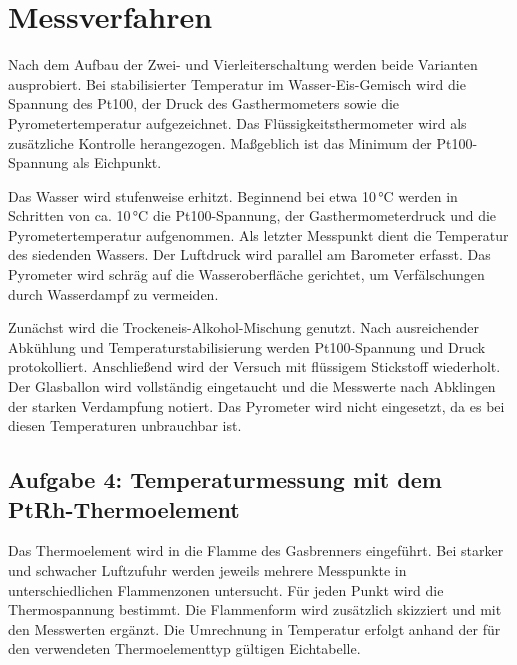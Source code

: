 \section{Messverfahren}


Nach dem Aufbau der Zwei- und Vierleiterschaltung werden beide Varianten ausprobiert. Bei stabilisierter Temperatur im Wasser-Eis-Gemisch wird die Spannung des Pt100, der Druck des Gasthermometers sowie die Pyrometertemperatur aufgezeichnet. Das Flüssigkeitsthermometer wird als zusätzliche Kontrolle herangezogen. Maßgeblich ist das Minimum der Pt100-Spannung als Eichpunkt.


Das Wasser wird stufenweise erhitzt. Beginnend bei etwa 10\,°C werden in Schritten von ca. 10\,°C die Pt100-Spannung, der Gasthermometerdruck und die Pyrometertemperatur aufgenommen. Als letzter Messpunkt dient die Temperatur des siedenden Wassers. Der Luftdruck wird parallel am Barometer erfasst. Das Pyrometer wird schräg auf die Wasseroberfläche gerichtet, um Verfälschungen durch Wasserdampf zu vermeiden.


Zunächst wird die Trockeneis-Alkohol-Mischung genutzt. Nach ausreichender Abkühlung und Temperaturstabilisierung werden Pt100-Spannung und Druck protokolliert. Anschließend wird der Versuch mit flüssigem Stickstoff wiederholt. Der Glasballon wird vollständig eingetaucht und die Messwerte nach Abklingen der starken Verdampfung notiert. Das Pyrometer wird nicht eingesetzt, da es bei diesen Temperaturen unbrauchbar ist.

\subsection*{Aufgabe 4: Temperaturmessung mit dem PtRh-Thermoelement}
Das Thermoelement wird in die Flamme des Gasbrenners eingeführt. Bei starker und schwacher Luftzufuhr werden jeweils mehrere Messpunkte in unterschiedlichen Flammenzonen untersucht. Für jeden Punkt wird die Thermospannung bestimmt. Die Flammenform wird zusätzlich skizziert und mit den Messwerten ergänzt. Die Umrechnung in Temperatur erfolgt anhand der für den verwendeten Thermoelementtyp gültigen Eichtabelle.
